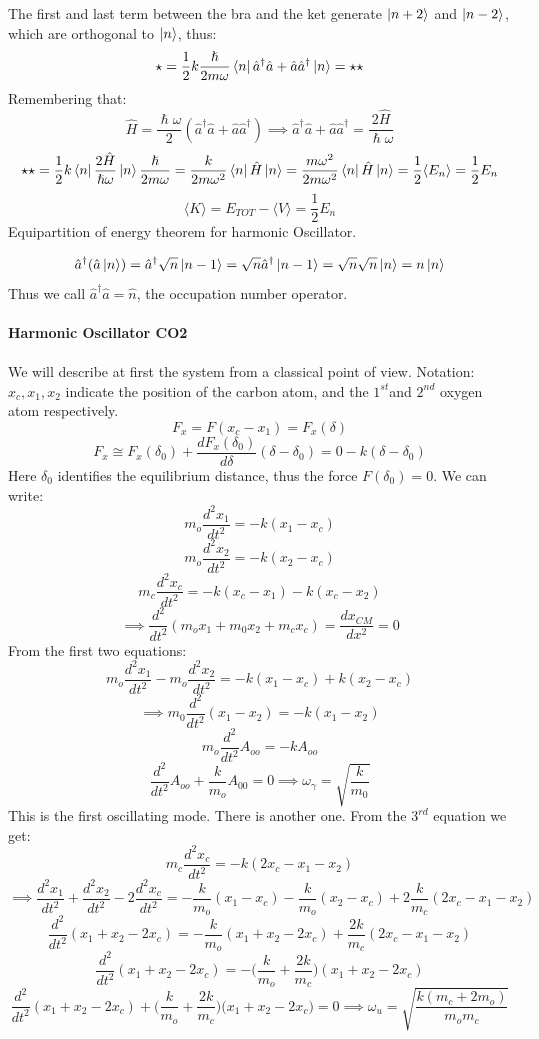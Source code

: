 \documentclass{article}
\begin{document}
The first and last term between the bra and the ket generate $\ket{n+2}$ and $\ket{n-2}$, which are orthogonal to $\ket{n}$, thus:
$$\star = \frac{1}{2}k \frac{\hslash}{2m\omega} \bra{n}\hat{a}^{\dag}\hat{a}+\hat{a}\hat{a}^{\dag} \ket{n} = \star \star$$
Remembering that:
$$\hat{H} = \frac{\hslash\omega}{2}(\hat{a}^{\dag}\hat{a}+\hat{a}\hat{a}^{\dag}) \implies \hat{a}^{\dag}\hat{a}+\hat{a}\hat{a}^{\dag} = \frac{2\hat{H}}{\hslash\omega} $$
$$ \star \star = \frac{1}{2} k \bra{n}\frac{2\hat{H}}{\hslash\omega}\ket{n}\frac{\hslash}{2m\omega}=\frac{k}{2m\omega^2}\bra{n}\hat{H}\ket{n}=\frac{m\omega^2}{2m\omega^2}\bra{n}\hat{H}\ket{n}=\frac{1}{2}\langle E_n \rangle = \frac{1}{2}E_n$$
$$\langle K \rangle = E_{TOT} -\langle V \rangle = \frac{1}{2} E_n$$
Equipartition of energy theorem for harmonic Oscillator.

$$ \hat{a}^{\dag}(\hat{a} \ket{n}) = \hat{a}^{\dag}\sqrt{n}\ket{n-1} =\sqrt{n}\hat{a}^\dag \ket{n-1}= \sqrt{n}\sqrt{n}\ket{n} = n \ket{n}$$
Thus we call $\hat{a}^{\dag}\hat{a} = \hat{n}$, the occupation  number operator.\\  \\ 
\textbf{Harmonic Oscillator CO2 }\\ \\
We will describe at first the system from a classical point of view.
Notation:$ x_c,x_1,x_2 $ indicate the position of the carbon atom, and the $ 1^{st}$and $2^{nd} $ oxygen atom respectively.
$$F_x = F(x_c-x_1) = F_x(\delta)$$
$$F_x  \cong F_x(\delta_0)+ \frac{dF_x(\delta_0)}{d\delta}(\delta-\delta_0) = 0 -k (\delta-\delta_0)$$
Here $\delta_0$ identifies the equilibrium distance, thus the force $F(\delta_0) = 0.$
We can write:
$$m_o \frac{d^2x_1}{dt^2} = -k(x_1-x_c)$$
$$m_o \frac{d^2x_2}{dt^2} = -k(x_2-x_c)$$
$$m_c \frac{d^2x_c}{dt^2} = -k(x_c-x_1)-k(x_c-x_2)$$
$$\implies\frac{d^2}{dt^2} (m_o x_1+m_0x_2+m_c x_c) = \frac{dx_{CM}}{dx^2} = 0$$
From the first two equations:
$$m_o \frac{d^2x_1}{dt^2}-m_o \frac{d^2x_2}{dt^2} = -k(x_1-x_c)+k(x_2-x_c)$$
$$\implies m_0 \frac{d^2}{dt^2}(x_1-x_2) = -k(x_1-x_2)$$
$$ m_o \frac{d^2}{dt^2}A_{oo} = -kA_{oo}$$
$$ \frac{d^2}{dt^2}A_{oo} +\frac{k}{m_o}A_{00}=0 \implies \omega_\gamma = \sqrt{\frac{k}{m_0}}$$
This is the first oscillating mode. There is another one. From the $3^{rd}$ equation we get:
$$m_c \frac{d^2x_c}{dt^2} = -k(2x_c-x_1-x_2)$$
$$\implies \frac{d^2x_1}{dt^2}+\frac{d^2x_2}{dt^2}-2\frac{d^2x_c}{dt^2} = -\frac{k}{m_o} (x_1-x_c)-\frac{k}{m_o} (x_2-x_c)+2\frac{k}{m_c}(2x_c-x_1-x_2)$$
$$\frac{d^2}{dt^2}(x_1+x_2-2x_c) = -\frac{k}{m_o}(x_1+x_2-2x_c)+\frac{2k}{m_c}(2x_c-x_1-x_2)$$
$$\frac{d^2}{dt^2}(x_1+x_2-2x_c) = -\biggl(\frac{k}{m_o}+\frac{2k}{m_c}\biggl)(x_1+x_2-2x_c)$$
$$\frac{d^2}{dt^2}(x_1+x_2-2x_c) + \biggl(\frac{k}{m_o}+\frac{2k}{m_c}\biggl)\biggl(x_1+x_2-2x_c\biggl) = 0 \implies\omega_u = \sqrt{\frac{k(m_c+2m_o)}{m_om_c}}$$
\end{document}
